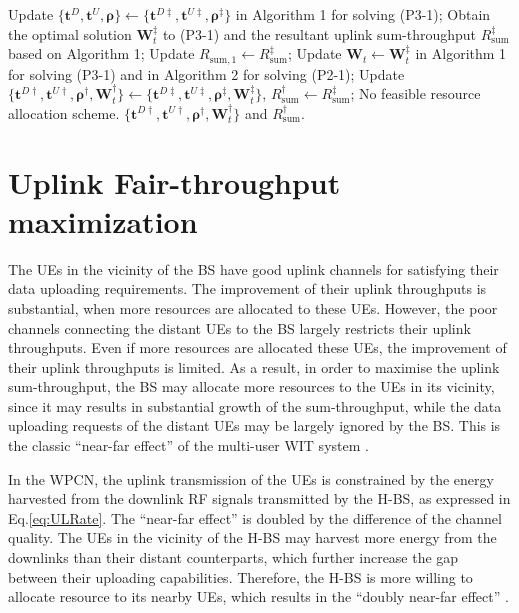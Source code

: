 \documentclass[12pt,draft,onecolumn,journal]{IEEEtran}
\begin{document}
\begin{algorithm}[!t]
\begin{algorithmic}[1]
				\STATE Update $\{\mathbf{t}^{D}, \mathbf{t}^{U}, \boldsymbol{\rho}\}\leftarrow \{\mathbf{t}^{D\ddagger}, \mathbf{t}^{U\ddagger}, \boldsymbol{\rho}^{\ddagger}\}$ in Algorithm 1 for solving (P3-1);
				\STATE Obtain the optimal solution $\mathbf{W}_t^{\ddagger}$ to (P3-1) and the resultant uplink sum-throughput $R_{\text{sum}}^{\ddagger}$ based on Algorithm 1;
				\STATE Update $R_{\text{sum},1}\leftarrow R_{\text{sum}}^{\ddagger}$;
				\STATE Update $\mathbf{W}_t \leftarrow \mathbf{W}_t^{\ddagger}$ in Algorithm 1 for solving (P3-1) and in Algorithm 2 for solving (P2-1);
			\ENDWHILE
			\STATE Update $\{\mathbf{t}^{D\dagger}, \mathbf{t}^{U\dagger}, \boldsymbol{\rho}^{\dagger}, \mathbf{W}_t^{\dagger}\} \leftarrow \{\mathbf{t}^{D\ddagger}, \mathbf{t}^{U\ddagger}, \boldsymbol{\rho}^{\ddagger}, \mathbf{W}_t^{\ddagger}\}$, $R_{\text{sum}}^{\dagger}\leftarrow R_{\text{sum}}^{\ddagger}$;
		\ELSE
			\STATE No feasible resource allocation scheme.
		\ENDIF
		\RETURN $\{\mathbf{t}^{D\dagger}, \mathbf{t}^{U\dagger}, \boldsymbol{\rho}^{\dagger}, \mathbf{W}_t^{\dagger}\}$ and $R_{\text{sum}}^{\dagger}$.
	\end{algorithmic}
\end{algorithm}

\section{Uplink Fair-throughput maximization}

The UEs in the vicinity of the BS have good uplink channels for satisfying their data uploading requirements. The improvement of their uplink throughputs is substantial, when more resources are allocated to these UEs. However, the poor channels connecting the distant UEs to the BS largely restricts their uplink throughputs. Even if more resources are allocated these UEs, the improvement of their uplink throughputs is limited. As a result, in order to maximise the uplink sum-throughput, the BS may allocate more resources to the UEs in its vicinity, since it may results in substantial growth of the sum-throughput, while the data uploading requests of the distant UEs may be largely ignored by the BS. This is the classic ``near-far effect'' of the multi-user WIT system \cite{wpcn_1}.

In the WPCN, the uplink transmission of the UEs is constrained by the energy harvested from the downlink RF signals transmitted by the H-BS, as expressed in Eq.\eqref{eq:ULRate}. The ``near-far effect'' is doubled by the difference of the channel quality. The UEs in the vicinity of the H-BS may harvest more energy from the downlinks than their distant counterparts, which further increase the gap between their uploading capabilities. Therefore, the H-BS is more willing to allocate resource to its nearby UEs, which results in the ``doubly near-far effect'' \cite{wpcn_1}. 
\end{document}
